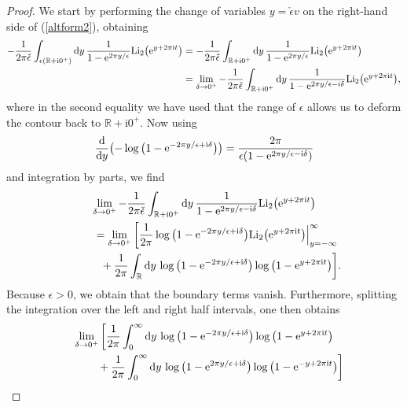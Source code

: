 \documentclass[pdftex]{sigma}
\numberwithin{equation}{section}
\begin{document}
\begin{proof}
We start by performing the change of variables $y=\check{\epsilon} v$ on the right-hand side of (\ref{altform2}), obtaining
\begin{align*}
 -\frac{1}{2\pi\check{\epsilon}}\int_{\epsilon(\mathbb{R}+\mathrm{i} 0^+)}{\rm d}y \, \frac{1}{1-{\rm e}^{2\pi y/\epsilon }}\mathrm{Li}_2\big({\rm e}^{y+2\pi \mathrm{i} t}\big)
 &=-\frac{1}{2\pi\check{\epsilon}}\int_{\mathbb{R}+\mathrm{i} 0^+}{\rm d}y\, \frac{1}{1-{\rm e}^{2\pi y/\epsilon }}\mathrm{Li}_2\big({\rm e}^{y+2\pi \mathrm{i} t}\big)\\
 &=\lim_{\delta \to 0^+}-\frac{1}{2\pi\check{\epsilon}}\int_{\mathbb{R}+\mathrm{i} 0^+}{\rm d}y\, \frac{1}{1-{\rm e}^{2\pi y/\epsilon -i\delta }}\mathrm{Li}_2\big({\rm e}^{y+2\pi \mathrm{i} t}\big),
 \end{align*}
where in the second equality we have used that the range of $\epsilon$ allows us to deform the contour back to $\mathbb{R}+\mathrm{i} 0^+$. Now using
\begin{equation*}
 \frac{{\rm d}}{{\rm d}y}\big({-}\log\big(1-{\rm e}^{-2\pi y/\epsilon +\mathrm{i} \delta}\big)\big)=\frac{2\pi }{\epsilon(1-{\rm e}^{2\pi y/\epsilon -\mathrm{i} \delta})}
\end{equation*}
and integration by parts, we find
\begin{gather*}
 \lim_{\delta \to 0^+} -\frac{1}{2\pi\check{\epsilon}}\int_{\mathbb{R}+\mathrm{i} 0^+}{\rm d}y \,\frac{1}{1-{\rm e}^{2\pi y/\epsilon -\mathrm{i}\delta }}\mathrm{Li}_2\big({\rm e}^{y+2\pi \mathrm{i} t}\big)\\
\qquad{}=\lim_{\delta\to 0^+}\bigg[\frac{1}{2\pi }\log\big(1-{\rm e}^{-2\pi y/\epsilon +\mathrm{i}\delta}\big)\mathrm{Li}_2\big({\rm e}^{y+2\pi {\rm i}t}\big)\Big|_{y=-\infty}^{\infty}\\
\qquad\quad{}+\frac{1}{2\pi }\int_{\mathbb{R}}{\rm d}y\, \log\big(1-{\rm e}^{-2\pi y/\epsilon +\mathrm{i}\delta}\big)\log\big(1-{\rm e}^{y+2\pi {\rm i}t}\big)\bigg].
 \end{gather*}
Because $\epsilon>0$, we obtain that the boundary terms vanish. Furthermore,
splitting the integration over the left and right half intervals, one then obtains
\begin{gather*}
 \lim_{\delta\to 0^+} \bigg[\frac{1}{2\pi }\int_{0}^{\infty}{\rm d}y\, \log\big(1-{\rm e}^{-2\pi y/\epsilon +\mathrm{i} \delta}\big)\log\big(1-{\rm e}^{y+2\pi \mathrm{i} t}\big)\\
 \qquad\quad{}+\frac{1}{2\pi }\int_{0}^{\infty}{\rm d}y \,\log\big(1-{\rm e}^{2\pi y/\epsilon +\mathrm{i}\delta}\big)\log\big(1-{\rm e}^{-y+2\pi \mathrm{i} t}\big)\bigg]\\

\end{gather*}
\end{proof}
\end{document}
